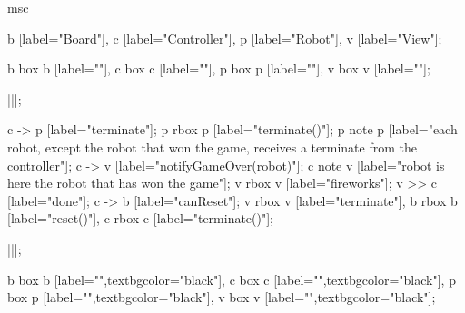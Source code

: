 \begin{msc}
msc
{

b [label="Board"],
c [label="Controller"],
p [label="Robot"],
v [label="View"];

b box b [label=""],
c box c [label=""],
p box p [label=""],
v box v [label=""];

|||;

c -> p [label="terminate"];
p rbox p [label="terminate()"];
p note p [label="each robot, except the robot that won the game, receives a terminate from the controller"];
c -> v [label="notifyGameOver(robot)"];
c note v [label="robot is here the robot that has won the game"];
v rbox v [label="fireworks"];
v >> c [label="done"];
c -> b [label="canReset"];
v rbox v [label="terminate"],
b rbox b [label="reset()"],
c rbox c [label="terminate()"];


|||;

b box b [label="",textbgcolor="black"],
c box c [label="",textbgcolor="black"],
p box p [label="",textbgcolor="black"],
v box v [label="",textbgcolor="black"];

}
\end{msc}

